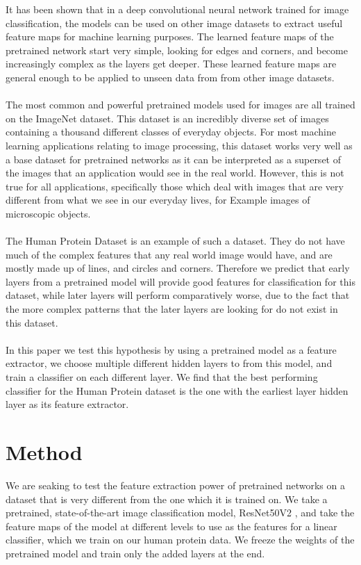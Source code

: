 \documentclass{article}
\begin{document}
It has been shown that in a deep convolutional neural network trained for image classification, the models
can be used on other image datasets to extract useful feature maps for machine learning purposes. The learned 
feature maps of the pretrained network start very simple, looking for edges and corners, and become increasingly
complex as the layers get deeper.\cite{10.1007/978-3-319-10590-1_53} These learned feature maps are general enough to be applied to unseen data from 
from other image datasets\cite{NIPS2014_5347}.
\\\\
The most common and powerful pretrained models used for images are all trained on the ImageNet dataset\cite{imagenet_cvpr09}. This dataset
is an incredibly diverse set of images containing a thousand different classes of everyday objects. For most machine learning
applications relating to image processing, this dataset works very well as a base dataset for pretrained networks as it can 
be interpreted as a superset of the images that an application would see in the real world. However, this is not true for all
applications, specifically those which deal with images that are very different from what we see in our everyday lives, for Example
images of microscopic objects.
\\\\
The Human Protein Dataset is an example of such a dataset. They do not have much of the complex features that any real world image would have, and are mostly made up of 
lines, and circles and corners. Therefore we predict that early layers from a pretrained model will
provide good features for classification for this dataset, while later layers will perform comparatively worse, 
due to the fact that the more complex patterns that the later layers are looking for do not exist in this 
dataset. 
\\\\
In this paper we test this hypothesis by using a pretrained model as a feature extractor, we choose multiple different
hidden layers to from this model, and train a classifier on each different layer. We find that the best performing classifier
for the Human Protein dataset is the one with the earliest layer hidden layer as its feature extractor.

\section{Method}
We are seaking to test the feature extraction power of pretrained networks on 
a dataset that is very different from the one which it is trained on. We take 
a pretrained, state-of-the-art image classification model, ResNet50V2 \cite{DBLP:journals/corr/HeZR016}, and take
the feature maps of the model at different levels to use as the features for 
a linear classifier, which we train on our human protein data. We freeze the weights
of the pretrained model and train only the added layers at the end.
\end{document}
